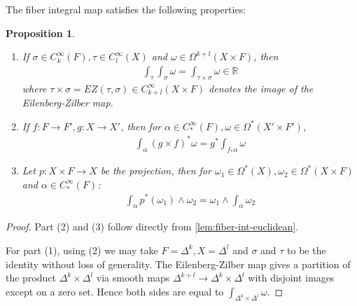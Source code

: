 \documentclass{scrartcl}
\theoremstyle{plain}
\newtheorem{proposition}[theorem]{Proposition}
\theoremstyle{definition}
\newcommand{\R}{\mathbb R}
\begin{document}
The fiber integral map satisfies the following properties:
\begin{proposition}
    \begin{enumerate}
        \item If $\sigma\in C^\infty_k(F), \tau\in C^\infty_l(X)$ and $\omega\in\Omega^{k+l}(X\times F)$, then
        \begin{align*}
            \int_\tau\int_\sigma\omega = \int_{\tau\times\sigma}\omega \in \R
        \end{align*}
        where $\tau\times\sigma = EZ(\tau,\sigma)\in C^\infty_{k+l}(X\times F)$ denotes the image of the Eilenberg-Zilber map. 
        \item If $f\colon F\to F', g\colon X\to X'$, then for $\alpha\in C^\infty_*(F), \omega\in \Omega^*(X'\times F')$,
        \begin{align*}
            \int_\alpha (g\times f)^*\omega = g^*\int_{f_*\alpha}\omega
        \end{align*}
        \item Let $p\colon X\times F\to X$ be the projection, then for $\omega_1\in\Omega^*(X), \omega_2\in\Omega^*(X\times F)$ and $\alpha\in C^\infty_*(F)$:
        \begin{align*}
            \int_{\alpha} p^*(\omega_1)\wedge\omega_2 = \omega_1\wedge\int_{\alpha}\omega_2
        \end{align*}
\end{enumerate}
\end{proposition}
\begin{proof}
    Part (2) and (3) follow directly from \cref{lem:fiber-int-euclidean}. 

    For part (1), using (2) we may take $F=\Delta^k, X=\Delta^l$ and $\sigma$ and $\tau$ to be the identity without loss of generality. The Eilenberg-Zilber map gives a partition of the product $\Delta^{k}\times\Delta^l$ via smooth maps $\Delta^{k+l}\to\Delta^k\times\Delta^l$ with disjoint images except on a zero set. Hence both sides are equal to $\int_{\Delta^k\times\Delta^l} \omega$. 
\end{proof}
\end{document}
